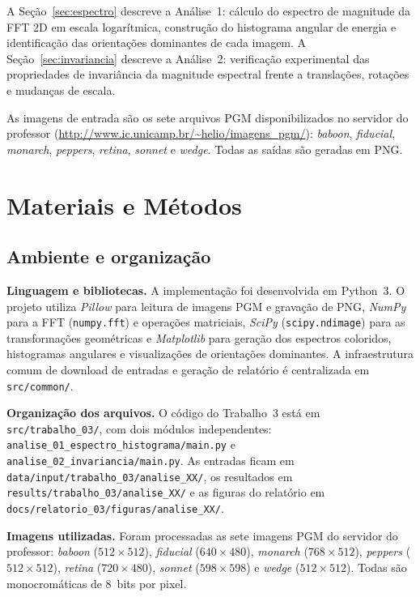 \documentclass[12pt,a4paper]{article}
\newcommand{\arquivo}[1]{\nolinkurl{#1}}
\newcommand{\campo}[2]{\textbf{#1.} #2\par}
\begin{document}
A Seção~\ref{sec:espectro} descreve a Análise~1: cálculo do espectro de magnitude
da FFT 2D em escala logarítmica, construção do histograma angular de energia e
identificação das orientações dominantes de cada imagem.
A Seção~\ref{sec:invariancia} descreve a Análise~2: verificação experimental das
propriedades de invariância da magnitude espectral frente a translações, rotações
e mudanças de escala.

As imagens de entrada são os sete arquivos PGM disponibilizados no servidor do professor
(\url{http://www.ic.unicamp.br/~helio/imagens_pgm/}): \textit{baboon}, \textit{fiducial},
\textit{monarch}, \textit{peppers}, \textit{retina}, \textit{sonnet} e \textit{wedge}.
Todas as saídas são geradas em PNG.

\section{Materiais e Métodos}
\label{sec:materiais}

\subsection{Ambiente e organização}

\campo{Linguagem e bibliotecas}{A implementação foi desenvolvida em Python~3. O projeto
utiliza \textit{Pillow} para leitura de imagens PGM e gravação de PNG, \textit{NumPy}
para a FFT (\texttt{numpy.fft}) e operações matriciais, \textit{SciPy}
(\texttt{scipy.ndimage}) para as transformações geométricas e \textit{Matplotlib} para
geração dos espectros coloridos, histogramas angulares e visualizações de orientações
dominantes. A infraestrutura comum de download de entradas e geração de relatório
é centralizada em \arquivo{src/common/}.}

\campo{Organização dos arquivos}{O código do Trabalho~3 está em
\arquivo{src/trabalho\_03/}, com dois módulos independentes:
\arquivo{analise\_01\_espectro\_histograma/main.py} e
\arquivo{analise\_02\_invariancia/main.py}.
As entradas ficam em \arquivo{data/input/trabalho\_03/analise\_XX/},
os resultados em \arquivo{results/trabalho\_03/analise\_XX/} e
as figuras do relatório em \arquivo{docs/relatorio\_03/figuras/analise\_XX/}.}

\campo{Imagens utilizadas}{Foram processadas as sete imagens PGM do servidor do
professor: \textit{baboon} ($512\times512$), \textit{fiducial} ($640\times480$),
\textit{monarch} ($768\times512$), \textit{peppers} ($512\times512$),
\textit{retina} ($720\times480$), \textit{sonnet} ($598\times598$) e
\textit{wedge} ($512\times512$). Todas são monocromáticas de 8~bits por pixel.}
\end{document}
